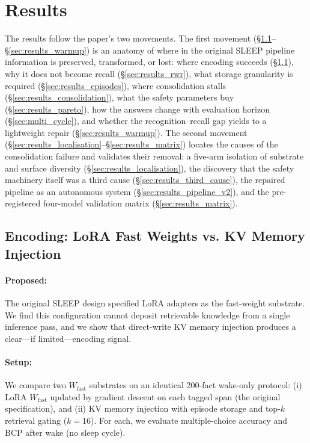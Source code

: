 
\section{Results}
\label{sec:results}

The results follow the paper's two movements. The first movement (\S\ref{sec:results_encoding}--\S\ref{sec:results_warmup}) is an anatomy of where in the original SLEEP pipeline information is preserved, transformed, or lost: where encoding succeeds (\S\ref{sec:results_encoding}), why it does not become recall (\S\ref{sec:results_rwr}), what storage granularity is required (\S\ref{sec:results_episodes}), where consolidation stalls (\S\ref{sec:results_consolidation}), what the safety parameters buy (\S\ref{sec:results_pareto}), how the answers change with evaluation horizon (\S\ref{sec:multi_cycle}), and whether the recognition--recall gap yields to a lightweight repair (\S\ref{sec:results_warmup}). The second movement (\S\ref{sec:results_localisation}--\S\ref{sec:results_matrix}) locates the causes of the consolidation failure and validates their removal: a five-arm isolation of substrate and surface diversity (\S\ref{sec:results_localisation}), the discovery that the safety machinery itself was a third cause (\S\ref{sec:results_third_cause}), the repaired pipeline as an autonomous system (\S\ref{sec:results_pipeline_v2}), and the pre-registered four-model validation matrix (\S\ref{sec:results_matrix}).

\subsection{Encoding: LoRA Fast Weights vs. KV Memory Injection}
\label{sec:results_encoding}

\paragraph{Proposed:} The original SLEEP design specified LoRA adapters as the fast-weight substrate. We find this configuration cannot deposit retrievable knowledge from a single inference pass, and we show that direct-write KV memory injection produces a clear---if limited---encoding signal.

\paragraph{Setup:} We compare two $W_{\mathrm{fast}}$ substrates on an identical 200-fact wake-only protocol: (i) LoRA $W_{\mathrm{fast}}$ updated by gradient descent on each tagged span (the original specification), and (ii) KV memory injection with episode storage and top-$k$ retrieval gating ($k=16$). For each, we evaluate multiple-choice accuracy and BCP after wake (no sleep cycle).

